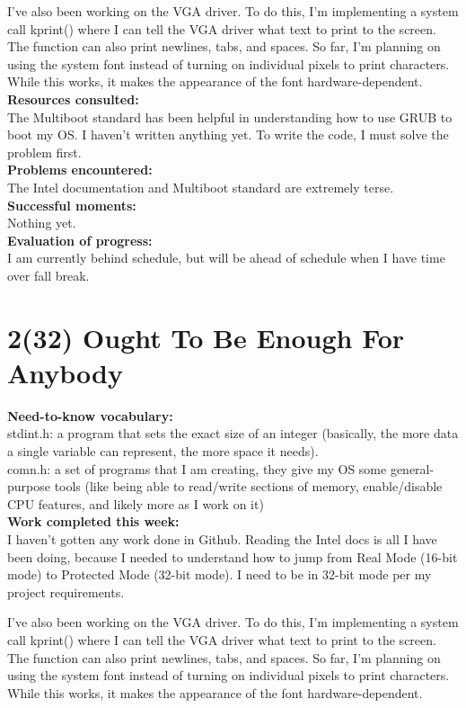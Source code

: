 \documentclass[11pt]{article}
\begin{document}
I've also been working on the VGA driver. To do this, I'm implementing a system call kprint() where I can tell the VGA driver what text to print to the screen. The function can also print newlines, tabs, and spaces. So far, I'm planning on using the system font instead of turning on individual pixels to print characters. While this works, it makes the appearance of the font hardware-dependent.\\
\textbf{Resources consulted:}\\
The Multiboot standard has been helpful in understanding how to use GRUB to boot my OS. I haven't written anything yet. To write the code, I must solve the problem first.\\
\textbf{Problems encountered:}\\
The Intel documentation and Multiboot standard are extremely terse.\\
\textbf{Successful moments:}\\
Nothing yet.\\
\textbf{Evaluation of progress:}\\
I am currently behind schedule, but will be ahead of schedule when I have time over fall break.
\section{2(32) Ought To Be Enough For Anybody}
\textbf{Need-to-know vocabulary:}\\
stdint.h: a program that sets the exact size of an integer (basically, the more data a single variable can represent, the more space it needs).\\
comn.h: a set of programs that I am creating, they give my OS some general-purpose tools (like being able to read/write sections of memory, enable/disable CPU features, and likely more as I work on it)\\
\textbf{Work completed this week:}\\
I haven't gotten any work done in Github. Reading the Intel docs is all I have been doing, because I needed to understand how to jump from Real Mode (16-bit mode) to Protected Mode (32-bit mode). I need to be in 32-bit mode per my project requirements.

I've also been working on the VGA driver. To do this, I'm implementing a system call kprint() where I can tell the VGA driver what text to print to the screen. The function can also print newlines, tabs, and spaces. So far, I'm planning on using the system font instead of turning on individual pixels to print characters. While this works, it makes the appearance of the font hardware-dependent.
\end{document}
